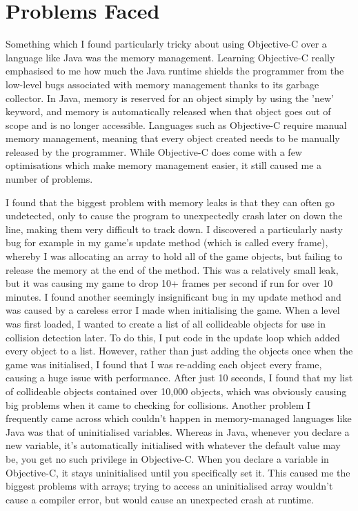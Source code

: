 \documentclass[a4paper,oneside]{report}
\begin{document}
\section{Problems Faced} 

Something which I found particularly tricky about using Objective-C over a language like Java was the memory management. Learning Objective-C really emphasised to me how much the Java runtime shields the programmer from the low-level bugs associated with memory management thanks to its garbage collector. In Java, memory is reserved for an object simply by using the 'new' keyword, and memory is automatically released when that object goes out of scope and is no longer accessible. Languages such as Objective-C  require manual memory management, meaning that every object created needs to be manually released by the programmer. While Objective-C does come with a few optimisations which make memory management easier, it still caused me a number of problems. 

I found that the biggest problem with memory leaks is that they can often go undetected, only to cause the program to unexpectedly crash later on down the line, making them very difficult to track down. I discovered a particularly nasty bug for example in my game's update method (which is called every frame), whereby I was allocating an array to hold all of the game objects, but failing to release the memory at the end of the method. This was a relatively small leak, but it was causing my game to drop 10+ frames per second if run for over 10 minutes. I found another seemingly insignificant bug in my update method and was caused by a careless error I made when initialising the game. When a level was first loaded, I wanted to create a list of all collideable objects for use in collision detection later. To do this, I put code in the update loop which added every object to a list. However, rather than just adding the objects once when the game was initialised, I found that I was re-adding each object every frame, causing a huge issue with performance. After just 10 seconds, I found that my list of collideable objects contained over 10,000 objects, which was obviously causing big problems when it came to checking for collisions. Another problem I frequently came across which couldn't happen in memory-managed languages like Java was that of uninitialised variables. Whereas in Java, whenever you declare a new variable, it's automatically initialised with whatever the default value may be, you get no such privilege in Objective-C. When you declare a variable in Objective-C, it stays uninitialised until you specifically set it. This caused me the biggest problems with arrays; trying to access an uninitialised array wouldn't cause a compiler error, but would cause an unexpected crash at runtime.
\end{document}
